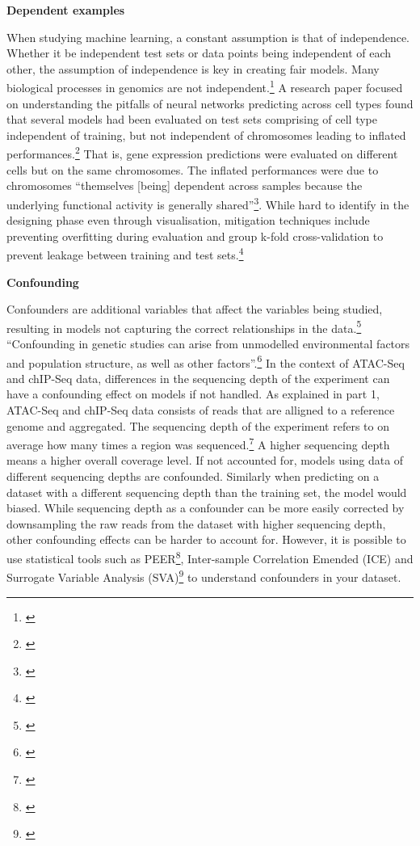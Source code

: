 \documentclass[
]{book}
\begin{document}
\textbf{Dependent examples}

When studying machine learning, a constant assumption is that of independence. Whether it be independent test sets or data points being independent of each other, the assumption of independence is key in creating fair models. Many biological processes in genomics are not independent.\footnote{\citet{allis2015}} A research paper focused on understanding the pitfalls of neural networks predicting across cell types found that several models had been evaluated on test sets comprising of cell type independent of training, but not independent of chromosomes leading to inflated performances.\footnote{\citet{jacob2020}} That is, gene expression predictions were evaluated on different cells but on the same chromosomes. The inflated performances were due to chromosomes ``themselves {[}being{]} dependent across samples because the underlying functional activity is generally shared''\footnote{\citet{whalen2022}}. While hard to identify in the designing phase even through visualisation, mitigation techniques include preventing overfitting during evaluation and group k-fold cross-validation to prevent leakage between training and test sets.\footnote{\citet{whalen2022}}

\textbf{Confounding}

Confounders are additional variables that affect the variables being studied, resulting in models not capturing the correct relationships in the data.\footnote{\citet{mo2012}} ``Confounding in genetic studies can arise from unmodelled environmental factors and population structure, as well as other factors''.\footnote{\citet{whalen2022}} In the context of ATAC-Seq and chIP-Seq data, differences in the sequencing depth of the experiment can have a confounding effect on models if not handled. As explained in part 1, ATAC-Seq and chIP-Seq data consists of reads that are alligned to a reference genome and aggregated. The sequencing depth of the experiment refers to on average how many times a region was sequenced.\footnote{\citet{sims2014}} A higher sequencing depth means a higher overall coverage level. If not accounted for, models using data of different sequencing depths are confounded. Similarly when predicting on a dataset with a different sequencing depth than the training set, the model would biased. While sequencing depth as a confounder can be more easily corrected by downsampling the raw reads from the dataset with higher sequencing depth, other confounding effects can be harder to account for. However, it is possible to use statistical tools such as PEER\footnote{\citet{oliver2012}}, Inter-sample Correlation Emended (ICE) and Surrogate Variable Analysis (SVA)\footnote{\citet{jen2010}} to understand confounders in your dataset.
\end{document}
